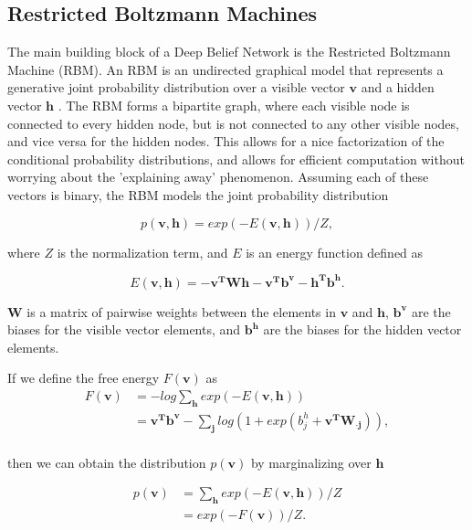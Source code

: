\documentclass{article}
\begin{document}
\subsection{Restricted Boltzmann Machines}

The main building block of a Deep Belief Network is the Restricted Boltzmann
Machine (RBM). An RBM is an undirected graphical model that represents a
generative joint probability distribution over a visible vector $\mathbf{v}$
and a hidden vector $\mathbf{h}$ \cite{mnih2012conditional}. The RBM forms a
bipartite graph, where each visible node is connected to every hidden node, but
is not connected to any other visible nodes, and vice versa for the hidden
nodes.  This allows for a nice factorization of the conditional probability
distributions, and allows for efficient computation without worrying about the
'explaining away' phenomenon. Assuming each of these vectors is binary,
the RBM models the joint probability distribution

\[
  p \left( \mathbf{v}, \mathbf{h} \right) = 
  exp \left(-E \left( \mathbf{v}, \mathbf{h} \right) \right) / Z,
\]

where $Z$ is the normalization term, and $E$ is an energy function defined as

\[
  E \left( \mathbf{v}, \mathbf{h} \right) = 
  - \mathbf{v^TWh} - \mathbf{v^Tb^v} - \mathbf{h^Tb^h}.
\]

$\mathbf{W}$ is a matrix of pairwise weights between the elements in 
$\mathbf{v}$ and $\mathbf{h}$, $\mathbf{b^v}$ are the biases for the visible
vector elements, and $\mathbf{b^h}$ are the biases for the hidden vector
elements.

If we define the free energy $F(\mathbf{v})$ as
\begin{align*}
  F \left( \mathbf{v} \right) &= -log \sum_{\mathbf{h}} exp \left( -E \left( \mathbf{v,h} \right) \right) \\
  &= \mathbf{v^Tb^v} - \sum_{\mathbf{j}} log
    \left(
      1 + exp \left( b_j^h + \mathbf{v^TW_{\cdot j}} \right)
    \right), \\
\end{align*}

then we can obtain the distribution $p(\mathbf{v})$ by marginalizing over
$\mathbf{h}$

\begin{align*}
  p(\mathbf{v}) &= \sum_{\mathbf{h}} exp(-E(\mathbf{v, h})) / Z \\
                &= exp(-F(\mathbf{v})) / Z. \\
\end{align*}
\end{document}
